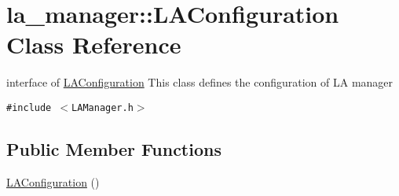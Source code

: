 \hypertarget{classla__manager_1_1LAConfiguration}{
\section{la\_\-manager::LAConfiguration Class Reference}
\label{classla__manager_1_1LAConfiguration}
}
interface of \hyperlink{classla__manager_1_1LAConfiguration}{LAConfiguration} This class defines the configuration of LA manager  


{\tt \#include $<$LAManager.h$>$}

\subsection*{Public Member Functions}
\begin{CompactItemize}
\item 
\hyperlink{classla__manager_1_1LAConfiguration_87843181ddb38cbed89ca0c5bce1dbb6}{LAConfiguration} ()
\end{CompactItemize}
